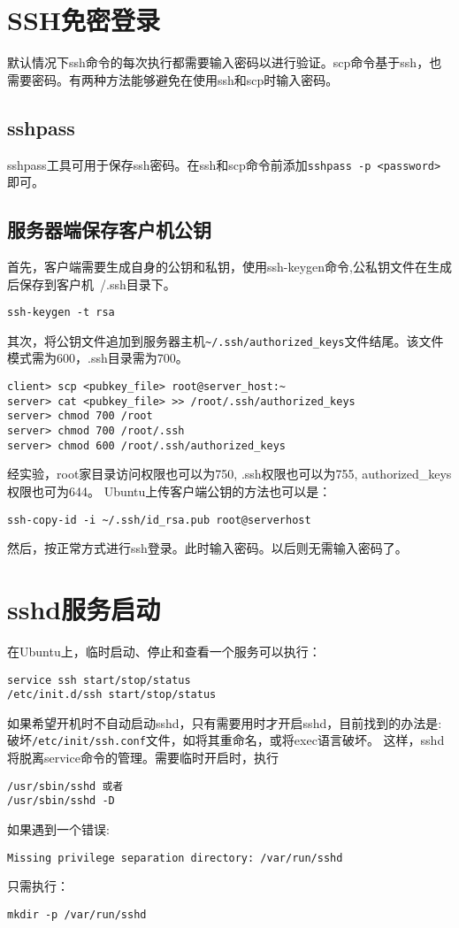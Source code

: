 \section{SSH免密登录}
默认情况下ssh命令的每次执行都需要输入密码以进行验证。scp命令基于ssh，也需要密码。有两种方法能够避免在使用ssh和scp时输入密码。

\subsection{sshpass}
sshpass工具可用于保存ssh密码。在ssh和scp命令前添加\verb+sshpass -p <password>+即可。

\subsection{服务器端保存客户机公钥}
首先，客户端需要生成自身的公钥和私钥，使用ssh-keygen命令,公私钥文件在生成后保存到客户机~/.ssh目录下。
\begin{verbatim}
ssh-keygen -t rsa
\end{verbatim}

其次，将公钥文件追加到服务器主机\verb+~/.ssh/authorized_keys+文件结尾。该文件模式需为600，.ssh目录需为700。
\begin{verbatim}
client> scp <pubkey_file> root@server_host:~
server> cat <pubkey_file> >> /root/.ssh/authorized_keys
server> chmod 700 /root
server> chmod 700 /root/.ssh
server> chmod 600 /root/.ssh/authorized_keys
\end{verbatim}
经实验，root家目录访问权限也可以为750, .ssh权限也可以为755, authorized\_keys权限也可为644。
Ubuntu上传客户端公钥的方法也可以是：
\begin{verbatim}
ssh-copy-id -i ~/.ssh/id_rsa.pub root@serverhost
\end{verbatim}


然后，按正常方式进行ssh登录。此时输入密码。以后则无需输入密码了。

\section{sshd服务启动}
在Ubuntu上，临时启动、停止和查看一个服务可以执行：
\begin{verbatim}
service ssh start/stop/status
/etc/init.d/ssh start/stop/status
\end{verbatim}

如果希望开机时不自动启动sshd，只有需要用时才开启sshd，目前找到的办法是:破坏\verb+/etc/init/ssh.conf+文件，如将其重命名，或将exec语言破坏。
这样，sshd将脱离service命令的管理。需要临时开启时，执行
\begin{verbatim}
/usr/sbin/sshd 或者
/usr/sbin/sshd -D
\end{verbatim}

如果遇到一个错误:
\begin{verbatim}
Missing privilege separation directory: /var/run/sshd
\end{verbatim}

只需执行：
\begin{verbatim}
mkdir -p /var/run/sshd
\end{verbatim}



